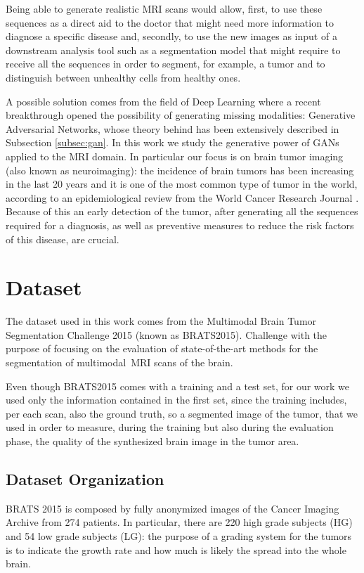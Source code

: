 Being able to generate realistic \ac{MRI} scans would allow, first, to use these sequences as a direct aid to the doctor that might need more information to diagnose a specific disease and, secondly, to use the new images as input of a downstream analysis tool such as a segmentation model that might require to receive all the sequences in order to segment, for example, a tumor and to distinguish between unhealthy cells from healthy ones.

A possible solution comes from the field of Deep Learning where a recent breakthrough opened the possibility of generating missing modalities: Generative Adversarial Networks, whose theory behind has been extensively described in Subsection \ref{subsec:gan}.
In this work we study the generative power of \ac{GAN}s applied to the \ac{MRI} domain. In particular our focus is on brain tumor imaging (also known as neuroimaging): the incidence of brain tumors has been increasing in the last 20 years and it is one of the most common type of tumor in the world, according to an epidemiological review from the World Cancer Research Journal \cite{epidemiological_review}. Because of this an early detection of the tumor, after generating all the sequences required for a diagnosis, as well as preventive measures to reduce the risk factors of this disease, are crucial.

\section{Dataset}
\label{sec:dataset}
The dataset used in this work comes from the Multimodal Brain Tumor Segmentation Challenge 2015 (known as BRATS2015)\cite{brats2015_1, brats2015_2}. Challenge with the purpose of focusing on the evaluation of state-of-the-art methods for the segmentation of multimodal~\ac{MRI} scans of the brain. 

Even though BRATS2015 comes with a training and a test set, for our work we used only the information contained in the first set, since the training includes, per each scan, also the ground truth, so a segmented image of the tumor, that we used in order to measure, during the training but also during the evaluation phase, the quality of the synthesized brain image in the tumor area. 

\subsection{Dataset Organization}
\label{sec:dataset_organization}
BRATS 2015 is composed by fully anonymized images of the Cancer Imaging Archive from 274 patients.
In particular, there are 220 high grade subjects (HG) and 54 low grade subjects (LG): the purpose of a grading system for the tumors is to indicate the growth rate and how much is likely the spread into the whole brain. 

